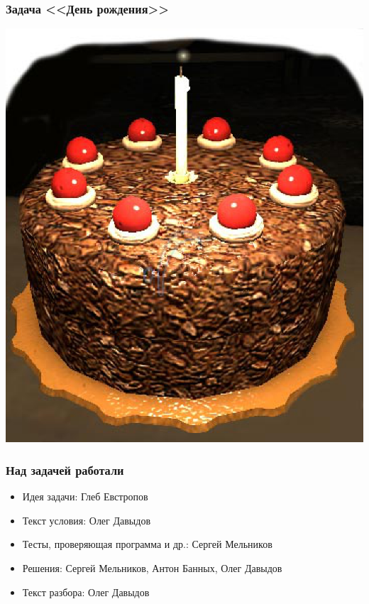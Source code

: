 \begin{frame}
  \frametitle{Задача <<День рождения>>}
  \begin{center}
    \includegraphics{party-cake.eps}
  \end{center}
\end{frame}

\begin{frame}
  \frametitle{Над задачей работали}
  \begin{itemize}
    \item Идея задачи: Глеб Евстропов
    \item Текст условия: Олег Давыдов
    \item Тесты, проверяющая программа и др.: Сергей Мельников
    \item Решения: Сергей Мельников, Антон Банных, Олег Давыдов
    \item Текст разбора: Олег Давыдов
  \end{itemize}
\end{frame}

